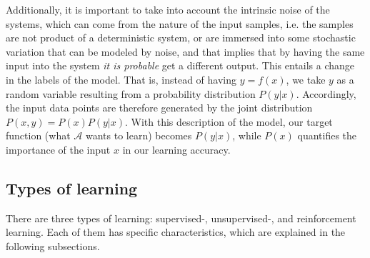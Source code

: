 Additionally, it is important to take into account the intrinsic noise of the systems, which can come from the nature of the input samples, i.e. the samples are not product of a deterministic system, or are immersed into some stochastic variation that can be modeled by noise, and that implies that by having the same input into the system \emph{it is probable} get a different output. This entails a change in the labels of the model. That is, instead of having \(y = f(x)\), we take \(y\) as a random variable resulting from a probability distribution \(P(y|x)\). Accordingly, the input data points are therefore generated by the joint distribution \(P(x,y) = P(x)P(y|x)\). With this description of the model, our target function (what \(\mathcal{A}\) wants to learn) becomes \(P(y|x)\), while \(P(x)\) quantifies the importance of the input \(x\) in our learning accuracy.

\subsection{Types of learning}\label{ch:learning_types}

There are three types of learning: supervised-, unsupervised-, and reinforcement learning. Each of them  has specific characteristics, which are explained in the following subsections.

